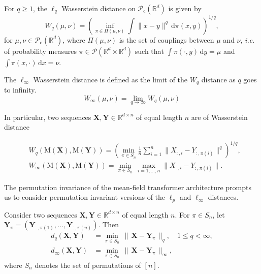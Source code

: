 \begin{definition}\label{def:wasserstein}
    For $q\geq1$, the $\ell_q$ Wasserstein distance on $\mathcal{P}_{\mathrm c}(\mathbb{R}^d)$ is given by
    \[
    W_q(\mu, \nu) = \left( \inf_{\pi \in \Pi(\mu, \nu)} \int \|x - y\|^q \, \mathrm{d}\pi(x, y) \right)^{1/q},
    \]
    for \( \mu, \nu \in \mathcal{P}_{\mathrm c}(\mathbb{R}^d) \), where \( \Pi(\mu, \nu) \) is the set of couplings between \( \mu \) and \( \nu \), {\it i.e.} of probability measures \( \pi \in \mathcal{P}(\mathbb{R}^d \times \mathbb{R}^d) \) such that \( \int \pi(\cdot, y)\, \mathrm{d}y = \mu \) and \( \int \pi(x, \cdot)\, \mathrm{d}x = \nu \).

    The $\ell_\infty$ Wasserstein distance is defined as the limit of the $W_q$ distance as $q$ goes to infinity.
    \[
    W_\infty(\mu, \nu) = \lim_{q\rightarrow\infty}W_q(\mu,\nu)
    \]

    In particular, two sequences $\mathbf{X},\mathbf{Y}\in \mathbb{R}^{d\times n}$ of equal length $n$ are of Wasserstein distance

    \begin{align*}
    &W_q(\mathrm{M}(\mathbf X), \mathrm{M}(\mathbf Y))
    = \left( \min_{\pi \in S_n} \frac{1}{n} \sum_{i=1}^n \| X_{:,i} - Y_{:,\pi(i)} \|^q \right)^{1/q},\\
    &W_\infty(\mathrm{M}(\mathbf X), \mathrm{M}(\mathbf Y))
    = \min_{\pi \in S_n} \, \max_{i=1,\dots,n} \| X_{:,i} - Y_{:,\pi(i)} \|.
    \end{align*}


\end{definition}


The permutation invariance of the mean-field transformer architecture prompts us to consider permutation invariant versions of the $\ell_p$ and $\ell_\infty$ distances.

\begin{definition}
    Consider two sequences $\mathbf{X},\mathbf{Y}\in \mathbb{R}^{d\times n}$ of equal length $n$.
    For $\pi\in S_n$, let $\mathbf{Y}_\pi = (\mathbf Y_{:,\pi(1)},\dots,\mathbf Y_{:,\pi(n)})$. Then
    \begin{align}
    d_q(\mathbf{X},\mathbf{Y})
    &= \min_{\pi\in S_n} \,\big\|\, \mathbf{X} - \mathbf{Y}_\pi \,\big\|_{q}, \nonumber
    \quad 1\le q<\infty, \\
    d_\infty(\mathbf{X},\mathbf{Y})\nonumber
    &= \min_{\pi\in S_n} \,\big\|\, \mathbf{X} - \mathbf{Y}_\pi \,\big\|_{\infty},
    \end{align}
    where $S_n$ denotes the set of permutations of $[n]$.
\end{definition}

